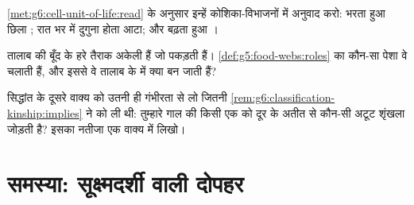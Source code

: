 \begin{exercise}[$\star\star$]\label{exo:g6:cell-unit-of-life:10}
\cref{met:g6:cell-unit-of-life:read} के अनुसार इन्हें कोशिका-विभाजनों
में अनुवाद करो: भरता हुआ छिला ; रात भर में दुगुना होता आटा; और
बढ़ता हुआ ।
\end{exercise}

\begin{exercise}[$\star\star$]\label{exo:g6:cell-unit-of-life:11}
तालाब की बूँद के हरे तैराक अकेली  हैं जो  पकड़ती हैं।
\cref{def:g5:food-webs:roles} का कौन-सा पेशा वे चलाती हैं, और इससे वे
तालाब के  में क्या बन जाती हैं?
\end{exercise}

\begin{exercise}[$\star\star\star$]\label{exo:g6:cell-unit-of-life:12}
 सिद्धांत के दूसरे वाक्य को उतनी ही गंभीरता से लो जितनी
\cref{rem:g6:classification-kinship:implies} ने  को ली थी:
तुम्हारे गाल की किसी एक  को दूर के अतीत से कौन-सी अटूट शृंखला
जोड़ती है? इसका नतीजा एक वाक्य में लिखो।
\end{exercise}

\section{समस्या: सूक्ष्मदर्शी वाली दोपहर}

